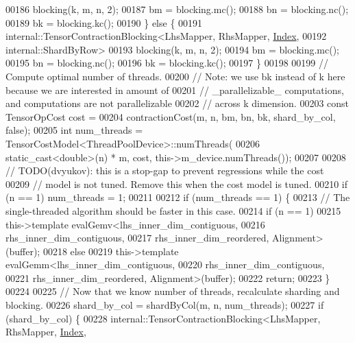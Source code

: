 \begin{DoxyCode}
00186           blocking(k, m, n, 2);
00187       bm = blocking.mc();
00188       bn = blocking.nc();
00189       bk = blocking.kc();
00190     \} \textcolor{keywordflow}{else} \{
00191       internal::TensorContractionBlocking<LhsMapper, RhsMapper, \hyperlink{namespace_eigen_a62e77e0933482dafde8fe197d9a2cfde}{Index},
00192                                           internal::ShardByRow>
00193           blocking(k, m, n, 2);
00194       bm = blocking.mc();
00195       bn = blocking.nc();
00196       bk = blocking.kc();
00197     \}
00198 
00199     \textcolor{comment}{// Compute optimal number of threads.}
00200     \textcolor{comment}{// Note: we use bk instead of k here because we are interested in amount of}
00201     \textcolor{comment}{// \_parallelizable\_ computations, and computations are not parallelizable}
00202     \textcolor{comment}{// across k dimension.}
00203     \textcolor{keyword}{const} TensorOpCost cost =
00204         contractionCost(m, n, bm, bn, bk, shard\_by\_col, \textcolor{keyword}{false});
00205     \textcolor{keywordtype}{int} num\_threads = TensorCostModel<ThreadPoolDevice>::numThreads(
00206         static\_cast<double>(n) * m, cost, this->m\_device.numThreads());
00207 
00208     \textcolor{comment}{// TODO(dvyukov): this is a stop-gap to prevent regressions while the cost}
00209     \textcolor{comment}{// model is not tuned. Remove this when the cost model is tuned.}
00210     \textcolor{keywordflow}{if} (n == 1) num\_threads = 1;
00211 
00212     \textcolor{keywordflow}{if} (num\_threads == 1) \{
00213       \textcolor{comment}{// The single-threaded algorithm should be faster in this case.}
00214       \textcolor{keywordflow}{if} (n == 1)
00215         this->\textcolor{keyword}{template} evalGemv<lhs\_inner\_dim\_contiguous,
00216                                 rhs\_inner\_dim\_contiguous,
00217                                 rhs\_inner\_dim\_reordered, Alignment>(buffer);
00218       \textcolor{keywordflow}{else}
00219         this->\textcolor{keyword}{template} evalGemm<lhs\_inner\_dim\_contiguous,
00220                                 rhs\_inner\_dim\_contiguous,
00221                                 rhs\_inner\_dim\_reordered, Alignment>(buffer);
00222       \textcolor{keywordflow}{return};
00223     \}
00224 
00225     \textcolor{comment}{// Now that we know number of threads, recalculate sharding and blocking.}
00226     shard\_by\_col = shardByCol(m, n, num\_threads);
00227     \textcolor{keywordflow}{if} (shard\_by\_col) \{
00228       internal::TensorContractionBlocking<LhsMapper, RhsMapper, \hyperlink{namespace_eigen_a62e77e0933482dafde8fe197d9a2cfde}{Index},

\end{DoxyCode}
